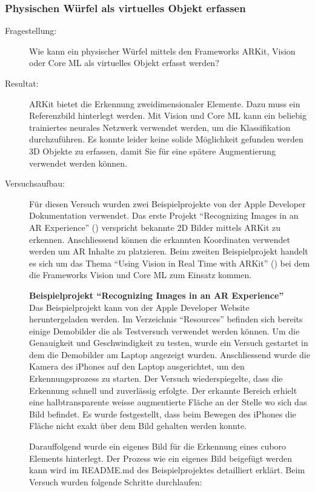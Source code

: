 \subsubsection{Physischen Würfel als virtuelles Objekt erfassen}\label{subsub:prot-physische-wuerfel}
\begin{description}
	\item[Fragestellung:] Wie kann ein physischer Würfel mittels den Frameworks ARKit, Vision oder Core ML als virtuelles Objekt erfasst werden?
	\item[Resultat:] ARKit bietet die Erkennung zweidimensionaler Elemente. Dazu muss ein Referenzbild hinterlegt werden.
	Mit Vision und Core ML kann ein beliebig trainiertes neurales Netzwerk verwendet werden, um die Klassifikation durchzuführen. Es konnte leider keine solide Möglichkeit gefunden werden 3D Objekte zu erfassen, damit Sie für eine spätere Augmentierung verwendet werden können. 
	\item[Versuchsaufbau:] Für diesen Versuch wurden zwei Beispielprojekte von der Apple Developer Dokumentation verwendet. Das erste Projekt "`Recognizing Images in an AR Experience"' (\cite{arkit-recognize-images}) verspricht bekannte 2D Bilder mittels ARKit zu erkennen. Anschliessend können die erkannten Koordinaten verwendet werden um AR Inhalte zu platzieren.
	Beim zweiten Beispielprojekt handelt es sich um das Thema "`Using Vision in Real Time with ARKit"' (\cite{vision-real-time-with-arkit}) bei dem die Frameworks Vision und Core ML zum Einsatz kommen.

	\textbf{Beispielprojekt "`Recognizing Images in an AR Experience"'} \\
	Das Beispielprojekt kann von der Apple Developer Website heruntergeladen werden. Im Verzeichnis "`Resources"' befinden sich bereits einige Demobilder die als Testversuch verwendet werden können. Um die Genauigkeit und Geschwindigkeit zu testen, wurde ein Versuch gestartet in dem die Demobilder am Laptop angezeigt wurden. Anschliessend wurde die Kamera des iPhones auf den Laptop ausgerichtet, um den Erkennungsprozess zu starten. Der Versuch wiederspiegelte, dass die Erkennung schnell und zuverlässig erfolgte. Der erkannte Bereich erhielt eine halbtransparente weisse augmentierte Fläche an der Stelle wo sich das Bild befindet. Es wurde festgestellt, dass beim Bewegen des iPhones die Fläche nicht exakt über dem Bild gehalten werden konnte.

	Darauffolgend wurde ein eigenes Bild für die Erkennung eines cuboro Elements hinterlegt. Der Prozess wie ein eigenes Bild beigefügt werden kann wird im README.md des Beispielprojektes detailliert erklärt. Beim Versuch wurden folgende Schritte durchlaufen:


\end{description}
